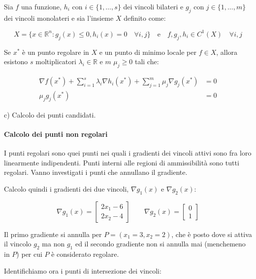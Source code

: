 \documentclass[\main/main.tex]{subfiles}
\begin{document}
\begin{theorem}
	Sia $f$ una funzione, $h_i \text{ con } i \in \{1, \ldots, s\}$ dei vincoli bilateri e $g_j \text{ con } j \in \{1, \ldots, m\}$ dei vincoli monolateri e sia l'insieme $X$ definito come:

	\[
		X  = \{x \in \mathbb{R}^n: g_j(x) \leq 0, h_i(x) = 0 \quad \forall i, j \} \quad \text{e} \quad f, g_j, h_i \in C^1(X) \quad \forall i,j
	\]

	Se $x^*$ è un punto regolare in $X$ e un punto di minimo locale per $f \in X$, allora esistono $s$ moltiplicatori $\lambda_i \in \mathbb{R}$ e $m$ $\mu_j \geq 0$ tali che:

	\begin{align*}
		\nabla f(x^*) + \sum_{i=1}^s \lambda_i \nabla h_i(x^*) + \sum_{j=1}^m \mu_j \nabla g_j(x^*) & = 0 \\
		\mu_j g_j(x^*)                                                                              & = 0
	\end{align*}
\end{theorem}

c) Calcolo dei punti candidati.

\paragraph*{Calcolo dei punti non regolari}
I punti regolari sono quei punti nei quali i gradienti dei vincoli attivi sono fra loro linearmente indipendenti. Punti interni alle regioni di ammissibilità sono tutti regolari. Vanno investigati i punti che annullano il gradiente.

Calcolo quindi i gradienti dei due vincoli, $\nabla g_1(x)$ e $\nabla g_2(x)$:

\[
	\nabla g_1(x) = \begin{bmatrix}
		2x_1 -6 \\
		2x_2 -4
	\end{bmatrix}
	\qquad
	\nabla g_2(x) = \begin{bmatrix}
		0 \\
		1
	\end{bmatrix}
\]

Il primo gradiente si annulla per $P = (x_1 = 3, x_2 = 2)$, che è posto dove si attiva il vincolo $g_2$ ma non $g_1$ ed il secondo gradiente non si annulla mai (menchemeno in $P$) per cui $P$ è considerato regolare.

Identifichiamo ora i punti di intersezione dei vincoli:
\end{document}
